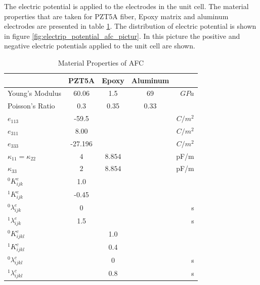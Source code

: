 The electric potential is applied to the electrodes in the unit cell.
The material properties that are taken for PZT5A fiber, Epoxy matrix and aluminum electrodes are presented in table \ref{table:materila_properties_afc}.
The distribution of electric potential is shown in figure \ref{fig:electrip_potential_afc_pictur}.
In this picture the positive and negative electric potentials applied to the unit cell are shown.

\begin{table}
\caption{Material Properties of AFC}
\centering
\begin{tabular}{|l|c|c|c|r|}
\hline
               & PZT5A & Epoxy & Aluminum & \\ \hline 
Young's Modulus&60.06 & 1.5     & 69       &$GPa$    \\ \hline
Poisson's Ratio&$0.3$ & 0.35    & 0.33 &\\ \hline 
$e_{113}$      &-59.5 &         &      &$C/m^2$\\ \hline
$e_{311}$      &8.00&         &      &$C/m^2$\\ \hline
$e_{333}$      &-27.196  &         &      &$C/m^2$\\ \hline
$\kappa_{11}=\kappa_{22}$ &  $ 4  $ & $8.854  $ & &  pF/m \\ \hline
$\kappa_{33}$ & $2  $              & $8.854  $ & &  pF/m \\ \hline
${}^{0}K_{ijk}^{e}$&1.0& & &  \\ \hline
${}^{1}K_{ijk}^{e}$&-0.45& & & \\ \hline
${}^{0}\lambda_{ijk}^{e}$&0& & & s \\ \hline
${}^{1}\lambda_{ijk}^{e}$&1.5& & & s \\ \hline 
${}^{0}K_{ijkl}^{c}$& &1.0 & &  \\ \hline 
${}^{1}K_{ijkl}^{c}$& &0.4 & & \\ \hline
${}^{0}\lambda_{ijkl}^{c}$& &0&  & s\\ \hline
${}^{1}\lambda_{ijkl}^{c}$& &0.8 & & s \\ \hline 
\end{tabular}
\label{table:materila_properties_afc} 
\end{table}

